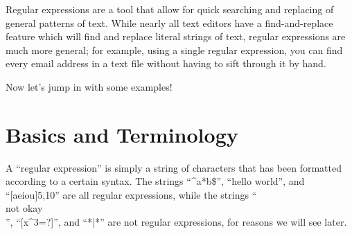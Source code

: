 







\label{lab:Regex_I}

Regular expressions are a tool that allow for quick searching and replacing of general patterns of text.
While nearly all text editors have a find-and-replace feature which will find and replace literal strings of text, regular expressions are much more general; for example, using a single regular expression, you can find every email address in a text file without having to sift through it by hand.

Now let's jump in with some examples!

\section*{Basics and Terminology}
A ``regular expression'' is simply a string of characters that has been formatted according to a certain syntax.
The strings ``^a*b\$'', ``hello world'', and ``[aeiou]{5,10}'' are all regular expressions, while the strings ``\\ not okay \\'', ``[x^3=?]'', and ``*{|}*'' are not regular expressions, for reasons we will see later.

